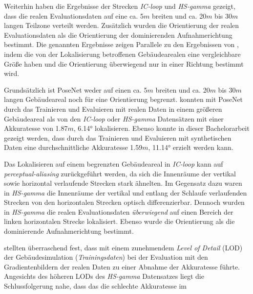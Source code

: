Weiterhin haben die Ergebnisse der Strecken \textit{IC-loop} und \textit{HS-gamma} gezeigt, dass die realen Evaluationsdaten auf eine ca. 5$m$ breiten und ca. 20$m$ bis 30$m$ langen Teilzone verteilt werden. Zusätzlich wurden die Orientierung der realen Evaluationsdaten als die Orientierung der dominierenden Aufnahmerichtung bestimmt. Die genannten Ergebnisse zeigen Parallele zu den Ergebnissen von \citet{acharyaBIMPoseNetIndoorCamera2019}, indem die von der Lokalisierung betroffenen Gebäudearealen eine vergleichbare Größe haben und die Orientierung überwiegend nur in einer Richtung bestimmt wird.

Grundsätzlich ist PoseNet weder auf einen ca. 5$m$ breiten und ca. 20$m$ bis 30$m$ langen Gebäudeareal noch für eine Orientierung begrenzt. \citet{walchImageBasedLocalizationUsing2017} konnten mit PoseNet durch das Trainieren und Evaluieren mit realen Daten in einem größeren Gebäudeareal als von den \textit{IC-loop} oder \textit{HS-gamma} Datensätzen mit einer Akkuratesse von 1.87$m$, 6.14° lokalisieren. Ebenso konnte in dieser Bachelorarbeit gezeigt werden, dass durch das Trainieren und Evaluieren mit synthetischen Daten eine durchschnittliche Akkuratesse 1.59$m$, 11.14° erzielt werden kann.


Das Lokalisieren auf einem begrenzten Gebäudeareal in \textit{IC-loop} kann auf \textit{perceptual-aliasing} zurückgeführt werden, da sich die Innenräume der vertikal sowie horizontal verlaufende Strecken stark ähnelten. Im Gegensatz dazu waren in \textit{HS-gamma} die Innenräume der vertikal und entlang der Schlaufe verlaufenden Strecken von den horizontalen Strecken optisch differenzierbar. Dennoch wurden in \textit{HS-gamma} die realen Evaluationsdaten \textit{überwiegend} auf einen Bereich der linken horizontalen Strecke lokalisiert. Ebenso wurde die Orientierung als die dominierende Aufnahmerichtung bestimmt.


\citet{acharyaBIMPoseNetIndoorCamera2019} stellten überraschend fest, dass mit einem zunehmendem \textit{Level of Detail} (LOD) der Gebäudesimulation (\textit{Trainingsdaten}) bei der Evaluation mit den Gradientenbildern der realen Daten zu einer Abnahme der Akkuratesse führte. Angesichts des höheren LODs des \textit{HS-gamma} Datensatzes liegt die Schlussfolgerung nahe, dass das die schlechte Akkuratesse im 








